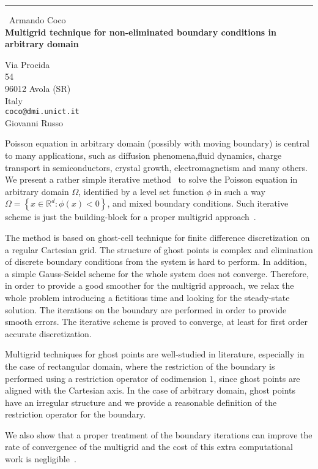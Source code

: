 \documentclass{report}
\begin{document}
\begin{center}
\rule{6in}{1pt} \
{\large Armando Coco \\
{\bf Multigrid technique for non-eliminated boundary conditions in arbitrary domain}}

Via Procida \\ 54 \\ 96012 Avola (SR) \\ Italy
\\
{\tt coco@dmi.unict.it}\\
Giovanni Russo\end{center}

Poisson equation in arbitrary domain (possibly with moving boundary) is
central to many applications, such as diffusion phenomena,fluid dynamics,
charge transport in semiconductors, crystal growth, electromagnetism and
many others.
We present a rather simple iterative method~\cite{CocoRusso:Elliptic} to
solve the Poisson equation in arbitrary domain $\Omega$, identified by a
level set function $\phi$ in such a way $\Omega=\left\{ x \in
\mathbb{R}^d \colon \phi(x)<0 \right\}$, and mixed boundary conditions.
Such iterative scheme is just the building-block for a proper multigrid
approach~\cite{CocoRusso:MG}.

The method is based on ghost-cell technique for finite difference
discretization on a regular Cartesian grid. The structure of ghost points
is complex and elimination of discrete boundary conditions from the
system is hard to perform. In addition, a simple Gauss-Seidel scheme for
the whole system does not converge. Therefore, in order to provide a good
smoother for the multigrid approach, we relax the whole problem
introducing a fictitious time and looking for the steady-state solution.
The iterations on the boundary are performed in order to provide smooth
errors. The iterative scheme is proved to converge, at least for first
order accurate discretization.

Multigrid techniques for ghost points are well-studied in literature,
especially in the case of rectangular domain, where the restriction of
the boundary is performed using a restriction operator of codimension
$1$, since ghost points are aligned with the Cartesian axis.
In the case of arbitrary domain, ghost points have an irregular structure
and we provide a reasonable definition of the restriction operator for
the boundary.

We also show that a proper treatment of the boundary iterations can
improve the rate of convergence of the multigrid and the cost of this
extra computational work is negligible~\cite{Brandt:analysis}.
\end{document}
